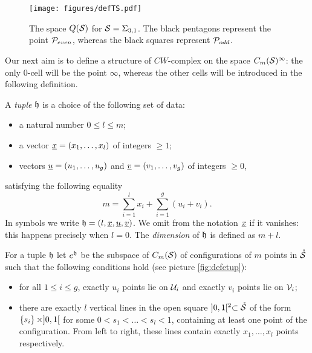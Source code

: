 \begin{figure}\centering
 \texttt{[image: figures/defTS.pdf]}
 \caption{The space $Q(\S)$ for $\S=\Sigma_{3,1}$. The black pentagons represent the point $\cP_{even}$, whereas the black
 squares represent $\cP_{odd}$.}
\label{fig:defTS}
\end{figure}


Our next aim is to define a structure of $CW$-complex on the space $\cms^{\infty}$:
the only $0$-cell will be the point $\infty$, whereas the other cells will be introduced
in the following definition.
\begin{defn}
\label{defn:ehopen}
A \emph{tuple} $\tup$ is a choice of the following set of data:
 \begin{itemize}
  \item a natural number $0\leq l\leq m$;
  \item a vector $\ux=(x_1,\dots, x_l)$ of integers $\geq 1$;
  \item vectors $\uu=(u_1,\dots,u_g)$ and $\uv=(v_1,\dots,v_g)$ of integers $\geq 0$,
 \end{itemize}
satisfying the following equality
\[
 m=\sum_{i=1}^lx_i+\sum_{i=1}^g(u_i+v_i).
\]
In symbols we write $\tup=(l,\ux,\uu,\uv)$. We omit from the notation $\ux$ if it vanishes: this happens precisely when $l=0$.
The \emph{dimension} of $\tup$ is defined as $m+l$.

For a tuple $\tup$ let $e^{\tup}$ be the subspace
of $\cms$ of configurations of $m$ points in $\mrS$ such that the following conditions hold
(see picture \ref{fig:defetup}):
\begin{itemize}
 \item for all $1\leq i\leq g$, exactly $u_i$ points lie on $\U_i$
 and exactly $v_i$ points lie on $\V_i$;
 \item there are exactly $l$ vertical lines in the open square $]0,1[^2\subset\mrS$ of the
 form $\set{s_i}\times]0,1[$ for some $0<s_1<\dots<s_l<1$, containing at least one
 point of the configuration. From left to right, these lines contain exactly $x_1,\dots,x_l$ points
 respectively.
\end{itemize}
\end{defn}


